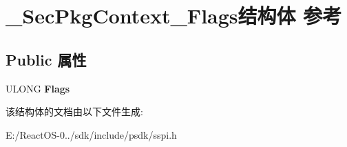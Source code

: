 \hypertarget{struct___sec_pkg_context___flags}{}\section{\+\_\+\+Sec\+Pkg\+Context\+\_\+\+Flags结构体 参考}
\label{struct___sec_pkg_context___flags}
\subsection*{Public 属性}
\begin{DoxyCompactItemize}
\item 
\mbox{\label{struct___sec_pkg_context___flags_accaba674c27b795f6e5c8f800c1a3202}} 
U\+L\+O\+NG {\bfseries Flags}
\end{DoxyCompactItemize}


该结构体的文档由以下文件生成\+:\begin{DoxyCompactItemize}
\item 
E\+:/\+React\+O\+S-\/0../sdk/include/psdk/sspi.\+h\end{DoxyCompactItemize}
